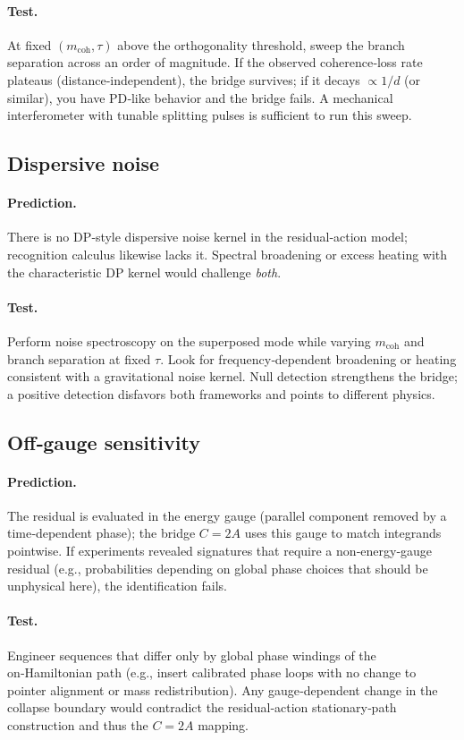 \documentclass[11pt,letterpaper]{article}
\theoremstyle{definition}
\begin{document}
\paragraph{Test.}
At fixed $(m_{\mathrm{coh}},\tau)$ above the orthogonality threshold, sweep the branch separation across an order of magnitude. If the observed coherence‑loss rate plateaus (distance‑independent), the bridge survives; if it decays $\propto 1/d$ (or similar), you have PD‑like behavior and the bridge fails. A mechanical interferometer with tunable splitting pulses is sufficient to run this sweep.

\subsection{Dispersive noise}

\paragraph{Prediction.}
There is no DP‑style dispersive noise kernel in the residual‑action model; recognition calculus likewise lacks it. Spectral broadening or excess heating with the characteristic DP kernel would challenge \emph{both}. %
\paragraph{Test.}
Perform noise spectroscopy on the superposed mode while varying $m_{\mathrm{coh}}$ and branch separation at fixed $\tau$. Look for frequency‑dependent broadening or heating consistent with a gravitational noise kernel. Null detection strengthens the bridge; a positive detection disfavors both frameworks and points to different physics.

\subsection{Off‑gauge sensitivity}

\paragraph{Prediction.}
The residual is evaluated in the energy gauge (parallel component removed by a time‑dependent phase); the bridge \(C=2A\) uses this gauge to match integrands pointwise. If experiments revealed signatures that require a non‑energy‑gauge residual (e.g., probabilities depending on global phase choices that should be unphysical here), the identification fails. %
\paragraph{Test.}
Engineer sequences that differ only by global phase windings of the on‑Hamiltonian path (e.g., insert calibrated phase loops with no change to pointer alignment or mass redistribution). Any gauge‑dependent change in the collapse boundary would contradict the residual‑action stationary‑path construction and thus the $C=2A$ mapping.
\end{document}
